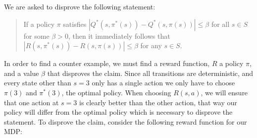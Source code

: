 \documentclass[11pt]{article}
\begin{document}
    We are asked to disprove the following statement:     
    \begin{quote}
    If a policy $\pi$ satisfies $|Q^*(s, \pi^*(s)) - Q^*(s, \pi(s))| \leq \beta$ for all $s \in S$ for some $\beta > 0$, then it immediately follows that $|R(s, \pi^*(s)) - R(s, \pi(s))| \leq \beta$ for any $s \in S$.
    \end{quote}
    In order to find a counter example, we must find a reward function, $R$ a policy $\pi$, and a value $\beta$ that disproves the claim. Since all transitions are deterministic, and 
    every state other than $s = 3$ only has a single action we only have to choose $\pi(3)$ and $\pi^*(3)$, the optimal policy. When choosing $R(s,a)$, we will ensure that one action at $s = 3$ is clearly better than the other action,
    that way our policy will differ from the optimal policy which is necessary to disprove the statement. To disprove the claim, consider the following reward function for our MDP:
\end{document}
